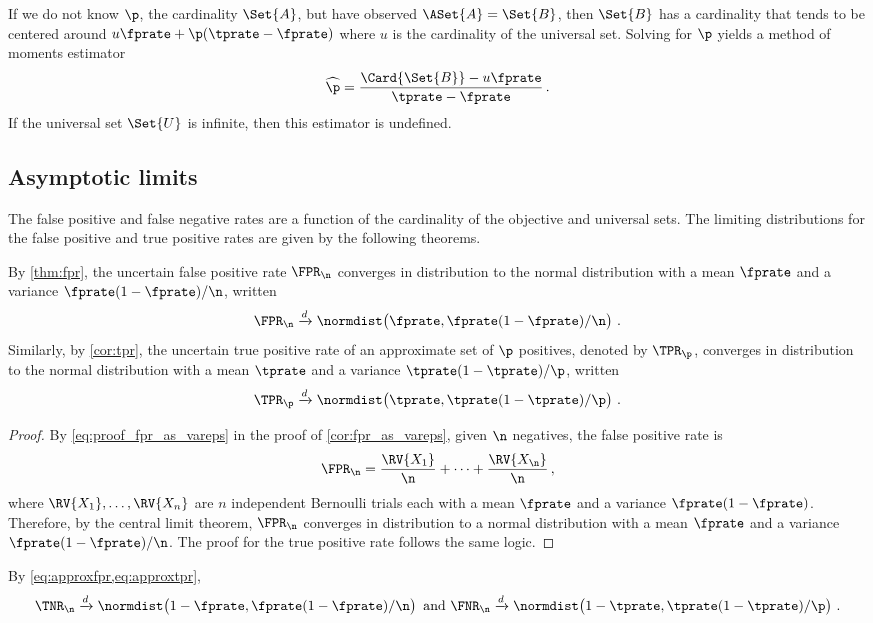 \documentclass[ ../main.tex]{subfiles}
\begin{document}
If we do not know $\p$, the cardinality $\Set{A}$, but have observed $\ASet{A} = \Set{B}$, then $\Set{B}$ has a cardinality that tends to be centered around $u \fprate + \p (\tprate - \fprate)$ where $u$ is the cardinality of the universal set.
Solving for $\p$ yields a method of moments estimator
\begin{equation}
	\widehat{\p} = \frac{\Card{\Set{B}} - u \fprate}{\tprate - \fprate}\,.
\end{equation}
If the universal set $\Set{U}$ is infinite, then this estimator is undefined.

\subsection{Asymptotic limits}
\label{sec:asymtotic}
The false positive and false negative rates are a function of the cardinality of the objective and universal sets.
The limiting distributions for the false positive and true positive rates are given by the following theorems.
\begin{theorem}
    \label{thm:approxfpr}
    By \cref{thm:fpr}, the uncertain false positive rate $\FPR_\n$ converges in
    distribution to the normal distribution with a mean $\fprate$ and a 
    variance $\fprate(1-\fprate)/\n$, written
    \begin{equation}
    \label{eq:approxfpr}
	    \FPR_\n \xrightarrow{d} \normdist\!\left(\fprate, \fprate(1-\fprate) / \n\right)\,.
    \end{equation}
    Similarly, by \cref{cor:tpr}, the uncertain true positive rate of an approximate  set of $\p$ positives, denoted by $\TPR_\p$, converges in distribution to the normal distribution with a mean $\tprate$ and a variance $\tprate(1-\tprate)/\p$, written
    \begin{equation}
    \label{eq:approxtpr}
    	\TPR_\p \xrightarrow{d} \normdist\!\left(\tprate, \tprate(1-\tprate) / \p\right)\,.
    \end{equation}
\end{theorem}
\begin{proof}
    By \cref{eq:proof_fpr_as_vareps} in the proof of \cref{cor:fpr_as_vareps}, 
    given 
    $\n$ negatives, the false positive rate is
    \begin{equation}
    	\FPR_\n = \frac{\RV{X_1}}{\n} + \cdots + \frac{\RV{X_\n}}{\n}\,,
    \end{equation}
    where $\RV{X_1},\ldots,\RV{X_n}$ are $n$ independent Bernoulli trials each with a mean $\fprate$ and a variance $\fprate(1-\fprate)$.
    Therefore, by the central limit theorem, $\FPR_\n$ converges in distribution to a normal distribution with a mean $\fprate$  and a variance $\fprate(1-\fprate)/\n$.
    The proof for the true positive rate follows the same logic.
\end{proof}
By \cref{eq:approxfpr,eq:approxtpr},
\begin{equation}
	\TNR_\n \xrightarrow{d} \normdist\!\left(1-\fprate, \fprate(1-\fprate) / \n\right) \text{ and } \FNR_\n \xrightarrow{d} \normdist\!\left(1-\tprate, \tprate(1-\tprate) / \p\right)\,.	
\end{equation}
\end{document}
